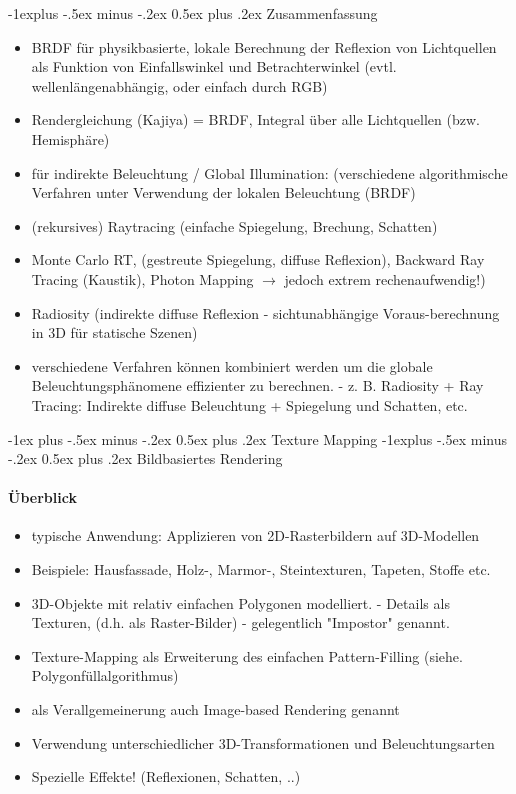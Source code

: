 \documentclass[10pt,landscape]{article}
\makeatletter
\renewcommand{\section}{\@startsection{section}{1}{0mm}%
                                {-1ex plus -.5ex minus -.2ex}%
                                {0.5ex plus .2ex}%
                                {\normalfont\large\bfseries}}
\renewcommand{\subsection}{\@startsection{subsection}{2}{0mm}%
                                {-1explus -.5ex minus -.2ex}%
                                {0.5ex plus .2ex}%
                                {\normalfont\normalsize\bfseries}}
\makeatother
\begin{document}
\begin{multicols}{3}
\subsection{ Zusammenfassung}
\begin{itemize}
  \item BRDF für physikbasierte, lokale Berechnung der Reflexion von Lichtquellen als Funktion von Einfallswinkel und Betrachterwinkel (evtl. wellenlängenabhängig, oder einfach durch RGB)
  \item Rendergleichung (Kajiya) = BRDF, Integral über alle Lichtquellen (bzw. Hemisphäre)
  \item für indirekte Beleuchtung / Global Illumination: (verschiedene algorithmische Verfahren unter Verwendung der lokalen Beleuchtung (BRDF)
  \item (rekursives) Raytracing (einfache Spiegelung, Brechung, Schatten)
  \item Monte Carlo RT, (gestreute Spiegelung, diffuse Reflexion), Backward Ray Tracing (Kaustik), Photon Mapping $\rightarrow$ jedoch extrem rechenaufwendig!)
  \item Radiosity (indirekte diffuse Reflexion - sichtunabhängige Voraus-berechnung in 3D für statische Szenen)
  \item verschiedene Verfahren können kombiniert werden um die globale Beleuchtungsphänomene effizienter zu berechnen. - z. B. Radiosity + Ray Tracing: Indirekte diffuse Beleuchtung + Spiegelung und Schatten, etc.
\end{itemize}

\section{Texture Mapping}
\subsection{ Bildbasiertes Rendering}
\paragraph{Überblick}
\begin{itemize}
  \item typische Anwendung: Applizieren von 2D-Rasterbildern auf 3D-Modellen
  \item Beispiele: Hausfassade, Holz-, Marmor-, Steintexturen, Tapeten, Stoffe etc.
  \item 3D-Objekte mit relativ einfachen Polygonen modelliert. - Details als Texturen, (d.h. als Raster-Bilder) - gelegentlich "Impostor" genannt.
  \item Texture-Mapping als Erweiterung des einfachen Pattern-Filling (siehe. Polygonfüllalgorithmus)
  \item als Verallgemeinerung auch Image-based Rendering genannt
  \item Verwendung unterschiedlicher 3D-Transformationen und Beleuchtungsarten
  \item Spezielle Effekte! (Reflexionen, Schatten, ..)
\end{itemize}


\end{multicols}
\end{document}
